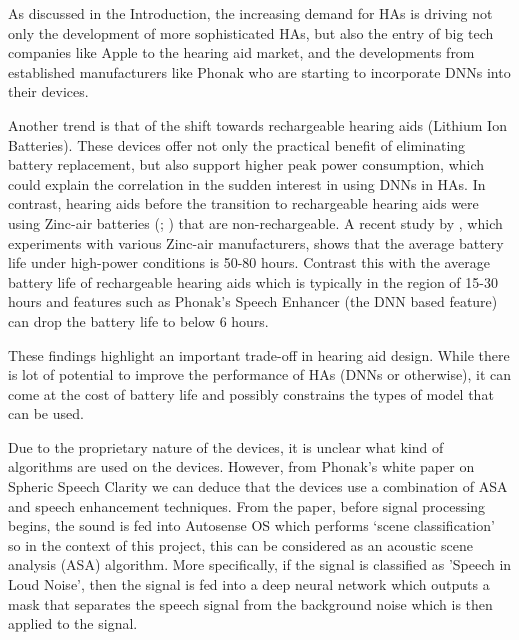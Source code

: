 \documentclass[logo,bsc,singlespacing,parskip,online]{infthesis}
\begin{document}

As discussed in the Introduction, the increasing demand for HAs is driving not only 
the development of more sophisticated HAs, but also the entry of big tech 
companies like Apple to the hearing aid market, and the developments from established 
manufacturers like Phonak who are starting to incorporate DNNs into their devices.

Another trend is that of the shift towards rechargeable hearing aids (Lithium Ion Batteries).
These devices offer not only the practical benefit of eliminating battery replacement, but also support higher peak power consumption, which could explain the correlation in the sudden interest in using DNNs in HAs.
In contrast, hearing aids before the transition to rechargeable hearing aids were using Zinc-air batteries 
(\cite{sparkes_study_1997}; \cite{mir_evaluation_2023})
that are non-rechargeable.
A recent study by \citet{thomas_zincair_2024}, which 
experiments with various Zinc-air manufacturers, shows that the average battery life 
under high-power conditions is 50-80 hours. Contrast this with the average battery life of 
rechargeable hearing aids which is typically in the region of 15-30 hours and 
features such as Phonak's Speech Enhancer (the DNN based feature) can drop the battery life 
to below 6 hours. 

These findings highlight an important trade-off in hearing aid design. While there is lot of potential to improve the performance of HAs (DNNs or otherwise),
it can come at the cost of battery life and possibly constrains 
the types of model that can be used. 

Due to the proprietary nature of the devices, it is unclear what kind of 
algorithms are used on the devices. However, from Phonak's white paper on Spheric Speech Clarity \cite{Hasemann2024PhonakSphere}
we can deduce that the devices use a combination of ASA and speech enhancement techniques.
From the paper, before signal processing begins, the sound is fed into Autosense OS which 
performs `scene classification' so in the context of this project, this can be 
considered as an acoustic scene analysis (ASA) algorithm. More specifically, if 
the signal is classified as 'Speech in Loud Noise', then the signal is fed into a 
deep neural network which outputs a mask that separates the speech signal from the background noise 
which is then applied to the signal. 
\end{document}
